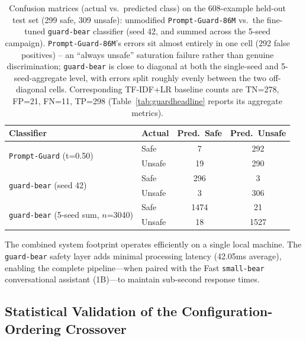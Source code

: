 \documentclass[pdflatex,sn-mathphys-num]{sn-jnl-official}%
\begin{document}
\begin{table}[!h]
  \centering
  \caption{Confusion matrices (actual vs.\ predicted class) on the 608-example held-out test set (299 safe, 309 unsafe): unmodified \texttt{Prompt-Guard-86M} vs.\ the fine-tuned \texttt{guard-bear} classifier (seed 42, and summed across the 5-seed campaign). \texttt{Prompt-Guard-86M}'s errors sit almost entirely in one cell (292 false positives) -- an ``always unsafe'' saturation failure rather than genuine discrimination; \texttt{guard-bear} is close to diagonal at both the single-seed and 5-seed-aggregate level, with errors split roughly evenly between the two off-diagonal cells. Corresponding TF-IDF+LR baseline counts are TN=278, FP=21, FN=11, TP=298 (Table~\ref{tab:guardheadline} reports its aggregate metrics).}
  \label{tab:confusion}
  \small
  \begin{tabular}{@{}ll cc@{}}
    \toprule
    Classifier & Actual & Pred.\ Safe & Pred.\ Unsafe \\
    \midrule
    \multirow{2}{*}{\texttt{Prompt-Guard} (t=0.50)}                  & Safe   & 7    & 292  \\
                                                                      & Unsafe & 19   & 290  \\
    \midrule
    \multirow{2}{*}{\texttt{guard-bear} (seed 42)}                   & Safe   & 296  & 3    \\
                                                                      & Unsafe & 3    & 306  \\
    \midrule
    \multirow{2}{*}{\texttt{guard-bear} (5-seed sum, $n$=3040)}      & Safe   & 1474 & 21   \\
                                                                      & Unsafe & 18   & 1527 \\
    \bottomrule
  \end{tabular}
\end{table}

\label{sec:deployment}The combined system footprint operates efficiently on a single local machine. The \texttt{guard-bear} safety layer adds minimal processing latency (42.05ms average), enabling the complete pipeline---when paired with the Fast \texttt{small-bear} conversational assistant (1B)---to maintain sub-second response times.

\subsection{Statistical Validation of the Configuration-Ordering Crossover}\label{sec:seedcampaign}
\end{document}
